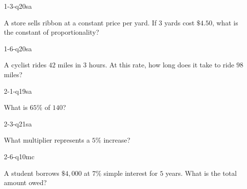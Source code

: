
\begin{practiceQuestion}{1-3-q20}{sa}
\begin{questionText}
A store sells ribbon at a constant price per yard. If $3$ yards cost $\$4.50$, what is the constant of proportionality?
\end{questionText}
\end{practiceQuestion}

\begin{practiceQuestion}{1-6-q20}{sa}
\begin{questionText}
A cyclist rides $42$ miles in $3$ hours. At this rate, how long does it take to ride $98$ miles?
\end{questionText}
\end{practiceQuestion}

\begin{practiceQuestion}{2-1-q19}{sa}
\begin{questionText}
What is $65\%$ of $140$?
\end{questionText}
\end{practiceQuestion}

\begin{practiceQuestion}{2-3-q21}{sa}
\begin{questionText}
What multiplier represents a $5\%$ increase?
\end{questionText}
\end{practiceQuestion}

\begin{practiceQuestion}{2-6-q10}{mc}
\begin{questionText}
A student borrows $\$4{,}000$ at $7\%$ simple interest for $5$ years. What is the total amount owed?
\end{questionText}
\end{practiceQuestion}

